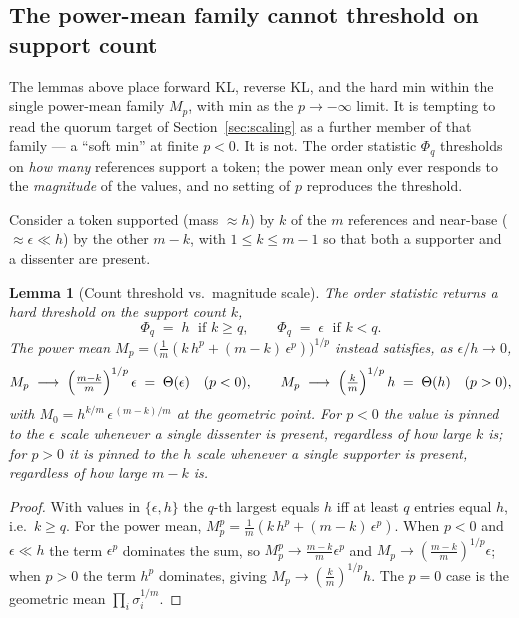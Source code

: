 \documentclass[11pt]{article}
\newtheorem{lemma}{Lemma}
\begin{document}
\subsection{The power-mean family cannot threshold on support count}
\label{app:quorum}

The lemmas above place forward KL, reverse KL, and the hard min within the single power-mean family $M_p$, with min as the $p \to -\infty$ limit. It is tempting to read the quorum target of Section~\ref{sec:scaling} as a further member of that family --- a ``soft min'' at finite $p < 0$. It is not. The order statistic $\Phi_q$ thresholds on \emph{how many} references support a token; the power mean only ever responds to the \emph{magnitude} of the values, and no setting of $p$ reproduces the threshold.

Consider a token supported (mass $\approx h$) by $k$ of the $m$ references and near-base ($\approx \epsilon \ll h$) by the other $m - k$, with $1 \le k \le m-1$ so that both a supporter and a dissenter are present.

\begin{lemma}[Count threshold vs.\ magnitude scale]
\label{lem:sep}
The order statistic returns a hard threshold on the support count $k$,
\[
\Phi_q \;=\; h \;\text{ if } k \ge q, \qquad \Phi_q \;=\; \epsilon \;\text{ if } k < q.
\]
The power mean $M_p = \bigl(\tfrac1m(k\,h^p + (m-k)\,\epsilon^p)\bigr)^{1/p}$ instead satisfies, as $\epsilon/h \to 0$,
\[
M_{p} \;\longrightarrow\; \Bigl(\tfrac{m-k}{m}\Bigr)^{1/p}\,\epsilon \;=\; \Theta(\epsilon) \quad (p < 0), \qquad
M_{p} \;\longrightarrow\; \Bigl(\tfrac{k}{m}\Bigr)^{1/p}\,h \;=\; \Theta(h) \quad (p > 0),
\]
with $M_0 = h^{k/m}\,\epsilon^{\,(m-k)/m}$ at the geometric point. For $p<0$ the value is pinned to the $\epsilon$ scale whenever a single dissenter is present, regardless of how large $k$ is; for $p>0$ it is pinned to the $h$ scale whenever a single supporter is present, regardless of how large $m-k$ is.
\end{lemma}

\begin{proof}
With values in $\{\epsilon,h\}$ the $q$-th largest equals $h$ iff at least $q$ entries equal $h$, i.e.\ $k \ge q$. For the power mean, $M_p^p = \tfrac1m(k\,h^p + (m-k)\,\epsilon^p)$. When $p < 0$ and $\epsilon \ll h$ the term $\epsilon^p$ dominates the sum, so $M_p^p \to \tfrac{m-k}{m}\epsilon^p$ and $M_p \to (\tfrac{m-k}{m})^{1/p}\epsilon$; when $p > 0$ the term $h^p$ dominates, giving $M_p \to (\tfrac{k}{m})^{1/p}h$. The $p=0$ case is the geometric mean $\prod_i \sigma_i^{1/m}$.
\end{proof}
\end{document}
